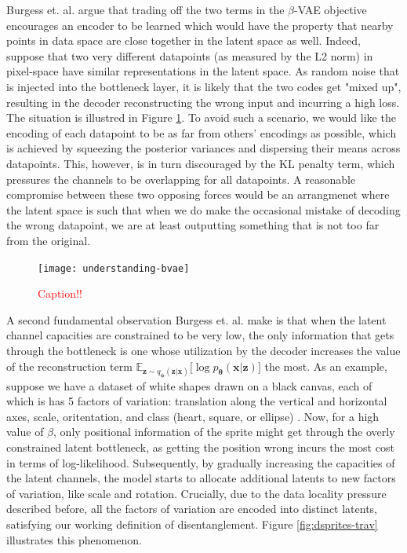 \documentclass{report}
\newcommand\todo[1]{\textcolor{red}{#1}}
\begin{document}
\noindent Burgess et. al. \cite{understanding-beta-vae} argue that trading off the two terms in the $\beta$-VAE objective encourages an encoder to be learned which would have the property that nearby points in data space are close together in the latent space as well. Indeed, suppose that two very different datapoints (as measured by the L2 norm) in pixel-space have similar representations in the latent space. As random noise that is injected into the bottleneck layer, it is likely that the two codes get "mixed up", resulting in the decoder reconstructing the wrong input and incurring a high loss. The situation is illustred in Figure \ref{fig:understanding-bvae}. To avoid such a scenario, we would like the encoding of each datapoint to be as far from others' encodings as possible, which is achieved by squeezing the posterior variances and dispersing their means across datapoints. This, however, is in turn discouraged by the KL penalty term, which pressures the channels to be overlapping for all datapoints. A reasonable compromise between these two opposing forces would be an arrangmenet where the latent space is such that when we do make the occasional mistake of decoding the wrong datapoint, we are at least outputting something that is not too far from the original. \\

\begin{figure}
\begin{center}
\texttt{[image: understanding-bvae]}
\caption{\todo{Caption!!}}
\label{fig:understanding-bvae}
\end{center}
\end{figure}

\noindent A second fundamental observation Burgess et. al. \cite{understanding-beta-vae} make is that when the latent channel capacities are constrained to be very low, the only information that gets through the bottleneck is one whose utilization by the decoder increases the value of the reconstruction term $\mathbb{E}_{\boldsymbol{z} \sim q_{\boldsymbol{\phi}}(\boldsymbol{z}|\boldsymbol{x})} \big[ \log p_{\boldsymbol{\theta}} (\boldsymbol{x} | \boldsymbol{z}) \big]$ the most. As an example, suppose we have a dataset of white shapes drawn on a black canvas, each of which is has 5 factors of variation: translation along the vertical and horizontal axes, scale, oritentation, and class (heart, square, or ellipse) \cite{dsprites17}. Now, for a high value of $\beta$, only positional information of the sprite might get through the overly constrained latent bottleneck, as getting the position wrong incurs the most cost in terms of log-likelihood. Subsequently, by gradually increasing the capacities of the latent channels, the model starts to allocate additional latents to new factors of variation, like scale and rotation. Crucially, due to the data locality pressure described before, all the factors of variation are encoded into distinct latents, satisfying our working definition of disentanglement. Figure \ref{fig:dsprites-trav} illustrates this phenomenon. \\
\end{document}
